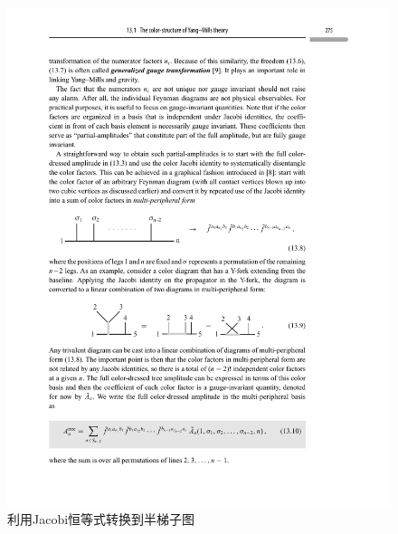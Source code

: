\begin{figure}[htbp]
	\centering
	\includegraphics[width=0.90\linewidth]{figs/fig11.pdf}
	\caption{利用Jacobi恒等式转换到半梯子图}
	\label{fig:6.4}
\end{figure}

